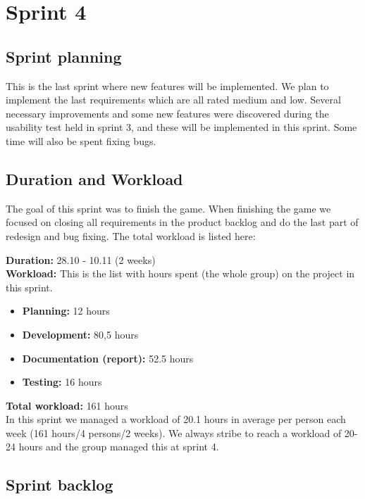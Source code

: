 \section{Sprint 4}

\subsection{Sprint planning}

	This is the last sprint where new features will be implemented. We plan to implement the last 
	requirements which are all rated medium and low. Several necessary improvements and some new 
	features were discovered during the usability test held in sprint 3, and these will be implemented 
	in this sprint. Some time will also be spent fixing bugs.

\subsection{Duration and Workload}

	The goal of this sprint was to finish the game. When finishing the game we focused on closing all
	requirements in the product backlog and do the last part of redesign and bug fixing. The total
	workload is listed here:

	{\bf Duration:} 28.10 - 10.11 (2 weeks)\\
	{\bf Workload:} This is the list with hours spent (the whole group) on the project in this sprint.
	\begin{itemize}
		\item {\bf Planning:}  12 hours
		\item {\bf Development:}  80,5 hours
		\item {\bf Documentation (report):} 52.5 hours
		\item {\bf Testing:} 16 hours
	\end{itemize}
	{\bf Total workload: }  161 hours \\

	In this sprint we managed a workload of 20.1 hours in average per person each week (161 hours/4 persons/2 weeks). We always stribe to reach a workload of 20-24 hours and the group managed this 
	at sprint 4.  

\clearpage
\subsection{Sprint backlog}


